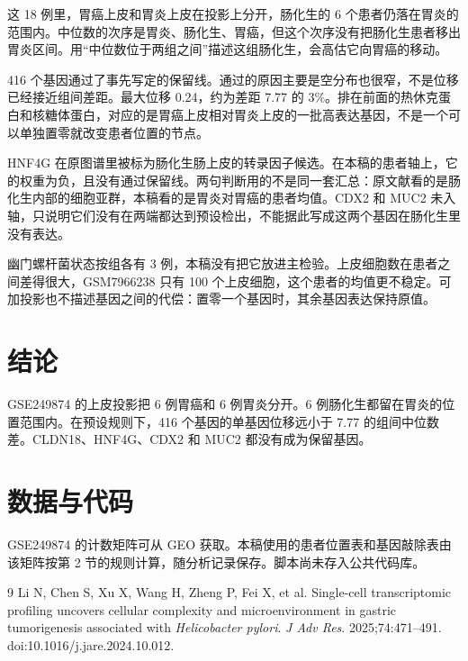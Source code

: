 \documentclass[12pt,a4paper,fontset=none]{ctexart}
\begin{document}
这 18 例里，胃癌上皮和胃炎上皮在投影上分开，肠化生的 6 个患者仍落在胃炎的范围内。中位数的次序是胃炎、肠化生、胃癌，但这个次序没有把肠化生患者移出胃炎区间。用“中位数位于两组之间”描述这组肠化生，会高估它向胃癌的移动。

416 个基因通过了事先写定的保留线。通过的原因主要是空分布也很窄，不是位移已经接近组间差距。最大位移 0.24，约为差距 7.77 的 3\%。排在前面的热休克蛋白和核糖体蛋白，对应的是胃癌上皮相对胃炎上皮的一批高表达基因，不是一个可以单独置零就改变患者位置的节点。

HNF4G 在原图谱里被标为肠化生肠上皮的转录因子候选\cite{li2025}。在本稿的患者轴上，它的权重为负，且没有通过保留线。两句判断用的不是同一套汇总：原文献看的是肠化生内部的细胞亚群，本稿看的是胃炎对胃癌的患者均值。CDX2 和 MUC2 未入轴，只说明它们没有在两端都达到预设检出，不能据此写成这两个基因在肠化生里没有表达。

幽门螺杆菌状态按组各有 3 例，本稿没有把它放进主检验。上皮细胞数在患者之间差得很大，GSM7966238 只有 100 个上皮细胞，这个患者的均值更不稳定。可加投影也不描述基因之间的代偿：置零一个基因时，其余基因表达保持原值。

\section{结论}

GSE249874 的上皮投影把 6 例胃癌和 6 例胃炎分开。6 例肠化生都留在胃炎的位置范围内。在预设规则下，416 个基因的单基因位移远小于 7.77 的组间中位数差。CLDN18、HNF4G、CDX2 和 MUC2 都没有成为保留基因。

\section*{数据与代码}

GSE249874 的计数矩阵可从 GEO 获取。本稿使用的患者位置表和基因敲除表由该矩阵按第 2 节的规则计算，随分析记录保存。脚本尚未存入公共代码库。

\begin{thebibliography}{9}
Li N, Chen S, Xu X, Wang H, Zheng P, Fei X, et al.
Single-cell transcriptomic profiling uncovers cellular complexity and microenvironment in gastric tumorigenesis associated with \textit{Helicobacter pylori}.
\textit{J Adv Res}. 2025;74:471--491.
doi:10.1016/j.jare.2024.10.012.
\end{thebibliography}
\end{document}
